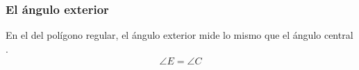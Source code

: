 \documentclass[14pt]{beamer}
\begin{document}
\begin{frame}
\frametitle{El ángulo exterior}
En el del polígono regular, el ángulo exterior  mide lo mismo que el ángulo central .
\pause
\begin{align*}
\angle{E} = \angle{C}
\end{align*}
\end{frame}

    
    

\end{document}
